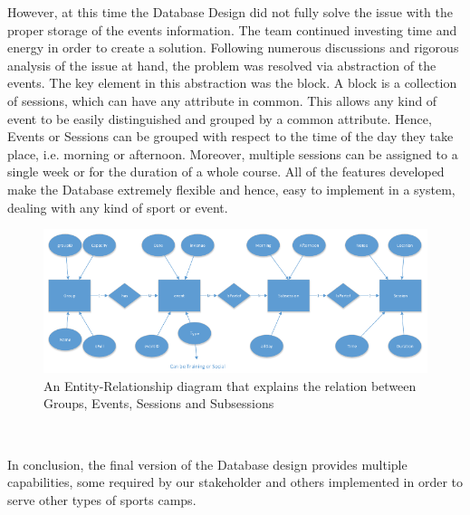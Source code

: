 \documentclass{l3proj}
\begin{document}
\par However, at this time the Database Design did not fully solve the issue with the proper storage of the events information. The team continued investing time and energy in order to create a solution. Following numerous discussions and rigorous analysis of the issue at hand, the problem was resolved via abstraction of the events. The key element in this abstraction was the block. A block is a collection of sessions, which can have any attribute in common. This allows any kind of event to be easily distinguished and grouped by a common attribute. Hence, Events or Sessions can be grouped with respect to the time of the day they take place, i.e. morning or afternoon. Moreover, multiple sessions can be assigned to a single week or for the duration of a whole course. All of the features developed make the Database extremely flexible and hence, easy to implement in a system, dealing with any kind of sport or event.
\\
{
\begin{figure}[h]
\caption{An Entity-Relationship diagram that explains the relation between Groups, Events, Sessions and Subsessions}
\centering
\includegraphics[scale=0.75]{ERDiagram.png}
\end{figure}
}
\\
\par In conclusion, the final version of the Database design provides multiple capabilities, some required by our stakeholder and others implemented in order to  serve other types of sports camps. \\

\end{document}
